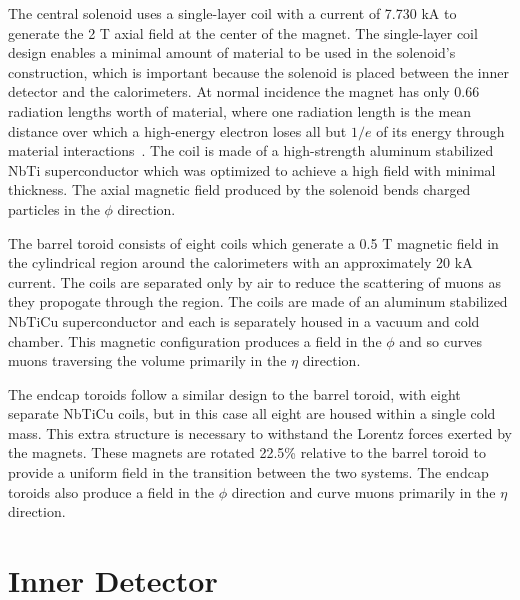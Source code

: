 The central solenoid uses a single-layer coil with a current of 7.730 kA to generate the 2 T axial field at the center of the magnet. 
The single-layer coil design enables a minimal amount of material to be used in the solenoid's construction, which is important because the solenoid is placed between the inner detector and the calorimeters.
At normal incidence the magnet has only 0.66 radiation lengths worth of material, where one radiation length is the mean distance over which a high-energy electron loses all but $1/e$ of its energy through material interactions~\cite{pdg}.
The coil is made of a high-strength aluminum stabilized NbTi superconductor which was optimized to achieve a high field with minimal thickness.
The axial magnetic field produced by the solenoid bends charged particles in the $\phi$ direction.

The barrel toroid consists of eight coils which generate a 0.5 T magnetic field in the cylindrical region around the calorimeters with an approximately 20 kA current.
The coils are separated only by air to reduce the scattering of muons as they propogate through the region.
The coils are made of an aluminum stabilized NbTiCu superconductor and each is separately housed in a vacuum and cold chamber.
This magnetic configuration produces a field in the $\phi$ and so curves muons traversing the volume primarily in the $\eta$ direction.

The endcap toroids follow a similar design to the barrel toroid, with eight separate NbTiCu coils, but in this case all eight are housed within a single cold mass.
This extra structure is necessary to withstand the Lorentz forces exerted by the magnets. 
These magnets are rotated 22.5\% relative to the barrel toroid to provide a uniform field in the transition between the two systems. 
The endcap toroids also produce a field in the $\phi$ direction and curve muons primarily in the $\eta$ direction.


\section{Inner Detector}


